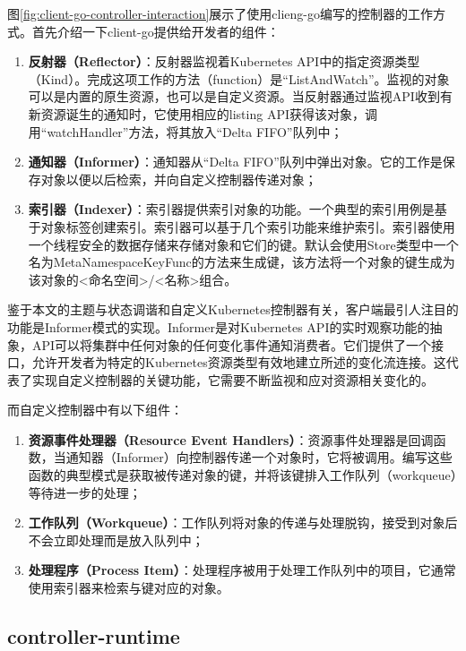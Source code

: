 \documentclass[macfonts,master]{njuthesis}
\begin{document}
图\ref{fig:client-go-controller-interaction}展示了使用clieng-go编写的控制器的工作方式。首先介绍一下client-go提供给开发者的组件：
\begin{enumerate}
	\item \textbf{反射器（Reflector）}：反射器监视着Kubernetes API中的指定资源类型（Kind）。完成这项工作的方法（function）是``ListAndWatch''。监视的对象可以是内置的原生资源，也可以是自定义资源。当反射器通过监视API收到有新资源诞生的通知时，它使用相应的listing API获得该对象，调用``watchHandler''方法，将其放入``Delta FIFO''队列中；
	\item \textbf{通知器（Informer）}：通知器从``Delta FIFO''队列中弹出对象。它的工作是保存对象以便以后检索，并向自定义控制器传递对象；
	\item \textbf{索引器（Indexer）}：索引器提供索引对象的功能。一个典型的索引用例是基于对象标签创建索引。索引器可以基于几个索引功能来维护索引。索引器使用一个线程安全的数据存储来存储对象和它们的键。默认会使用Store类型中一个名为MetaNamespaceKeyFunc的方法来生成键，该方法将一个对象的键生成为该对象的<命名空间>/<名称>组合。
\end{enumerate}

鉴于本文的主题与状态调谐和自定义Kubernetes控制器有关，客户端最引人注目的功能是Informer模式的实现\cite{informer}。Informer是对Kubernetes API的实时观察功能的抽象，API可以将集群中任何对象的任何变化事件通知消费者。它们提供了一个接口，允许开发者为特定的Kubernetes资源类型有效地建立所述的变化流连接\cite{informer}。这代表了实现自定义控制器的关键功能，它需要不断监视和应对资源相关变化的。

而自定义控制器中有以下组件：
\begin{enumerate}
	\item \textbf{资源事件处理器（Resource Event Handlers）}：资源事件处理器是回调函数，当通知器（Informer）向控制器传递一个对象时，它将被调用。编写这些函数的典型模式是获取被传递对象的键，并将该键排入工作队列（workqueue）等待进一步的处理；
	\item \textbf{工作队列（Workqueue）}：工作队列将对象的传递与处理脱钩，接受到对象后不会立即处理而是放入队列中；
	\item \textbf{处理程序（Process Item）}：处理程序被用于处理工作队列中的项目，它通常使用索引器来检索与键对应的对象。
\end{enumerate}

\subsection{controller-runtime}
\end{document}
